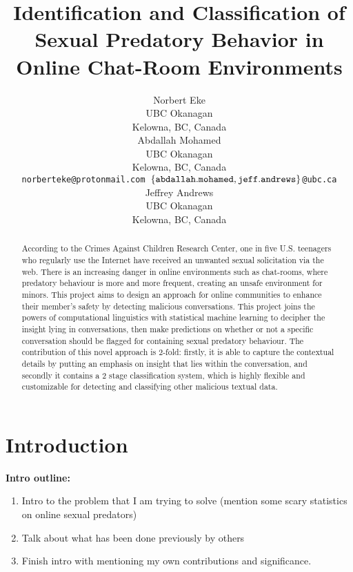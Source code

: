 \documentclass[11pt]{article}
\title{Identification and Classification of Sexual Predatory Behavior in Online Chat-Room Environments}
\author{Norbert Eke \\
  UBC Okanagan \\
  Kelowna, BC, Canada \\
 \And
  Abdallah Mohamed \\
  UBC Okanagan \\
  Kelowna, BC, Canada \\
  {\tt norberteke@protonmail.com \tab  $\left\{\tt abdallah.mohamed, jeff.andrews \right\}$\tt @ubc.ca} \\
  \And
  Jeffrey Andrews \\
  UBC Okanagan \\
  Kelowna, BC, Canada \\
 }
\date{}
\begin{document}
\maketitle

\begin{abstract} According to the Crimes Against Children Research Center, one in five U.S. teenagers who regularly use the Internet have received an unwanted sexual solicitation via the web. There is an increasing danger in online environments such as chat-rooms, where predatory behaviour is more and more frequent, creating an unsafe environment for minors. 
This project aims to design an approach for online communities to enhance their member’s safety by detecting malicious conversations. This project joins the powers of computational linguistics with statistical machine learning to decipher the insight lying in conversations, then make predictions on whether or not a specific conversation should be flagged for containing sexual predatory behaviour. 
The contribution of this novel approach is 2-fold: firstly, it is able to capture the contextual details by putting an emphasis on insight that lies within the conversation, and secondly it contains a 2 stage classification system, which is highly flexible and customizable for detecting and classifying other malicious textual data. 
\end{abstract}

\section{Introduction}
\textbf{Intro outline:}
\begin{enumerate}
    \item Intro to the problem that I am trying to solve (mention some scary statistics on online sexual predators)
    \item Talk about what has been done previously by others
    \item Finish intro with mentioning my own contributions and significance.
\end{enumerate}
\end{document}
